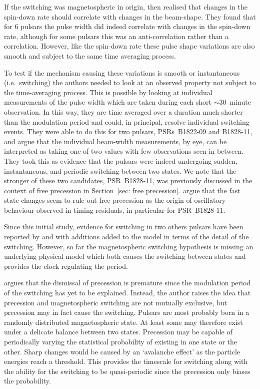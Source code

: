 If the switching was magnetospheric in origin, then \citet{Lyne2010} realised
that changes in the spin-down rate should correlate with changes in the
beam-shape.  They found that for 6 pulsars the pulse width did indeed correlate
with changes in the spin-down rate, although for some pulsars this was an
anti-correlation rather than a correlation. However, like the spin-down rate
these pulse shape variations are also smooth and subject to the same time
averaging process.

To test if the mechanism causing these variations is smooth or instantaneous
(i.e.\ switching) the authors needed to look at an observed property not subject
to the time-averaging process.  This is possible by looking at individual
measurements of the pulse width which are taken during each short $\sim30$~minute
observation. In this way, they are time averaged over a duration much shorter
than the modulation period and could, in principal, resolve individual
switching events. They were able to do this for two pulsars, PSRs~B1822-09 and
B1828-11, and argue that the individual beam-width measurements, by eye, can be
interpreted as taking one of two values with few observations seen in between.
They took this as evidence that the pulsars were indeed undergoing sudden,
instantaneous, and periodic switching between two states. We note that the
stronger of these two candidates, PSR~B1828-11, was previously discussed in the
context of free precession in Section~\ref{sec: free precession}.
\citet{Lyne2010} argue that the fast state changes seem to rule out free
precession as the origin of oscillatory behaviour observed in timing residuals,
in particular for PSR~B1828-11.

Since this initial study, evidence for switching in two others pulsars have
been reported by \citet{Perera2015} and \citet{Perera2016} with additions added
to the model in terms of the detail of the switching. However, so far the
magnetospheric switching hypothesis is missing an underlying physical model
which both causes the switching between states and provides the clock regulating
the period.


\citet{Jones2012} argues that the dismissal of precession is premature since
the modulation period of the switching has yet to be explained.  Instead, the
author raises the idea that precession and magnetospheric switching are not
mutually exclusive, but precession may in fact cause the switching. Pulsars are
most probably born in a randomly distributed magnetospheric state. At least
some may therefore exist under a delicate balance between two states.
Precession may be capable of periodically varying the statistical probability
of existing in one state or the other. Sharp changes would be caused by an
`avalanche effect' as the particle energies reach a threshold.  This provides
the timescale for switching along with the ability for the switching to be
quasi-periodic since the precession only biases the probability.


